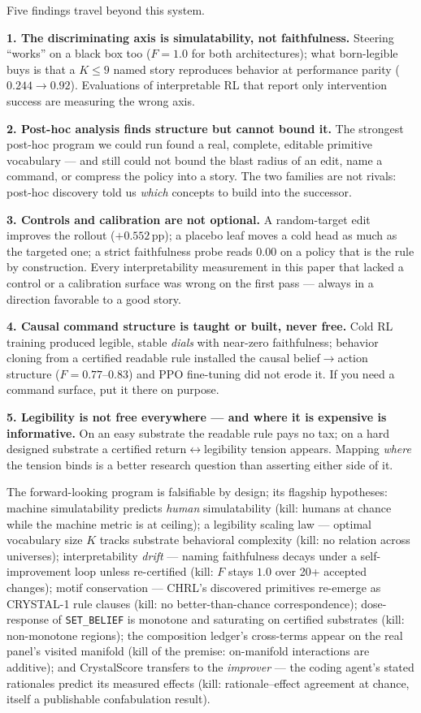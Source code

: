 \documentclass[11pt]{article}
\begin{document}
Five findings travel beyond this system.

\textbf{1. The discriminating axis is simulatability, not faithfulness.} Steering ``works'' on
a black box too ($F{=}1.0$ for both architectures); what born-legible buys is that a $K{\le}9$
named story reproduces behavior at performance parity ($0.244 \to 0.92$). Evaluations of
interpretable RL that report only intervention success are measuring the wrong axis.

\textbf{2. Post-hoc analysis finds structure but cannot bound it.} The strongest post-hoc
program we could run found a real, complete, editable primitive vocabulary --- and still could
not bound the blast radius of an edit, name a command, or compress the policy into a story.
The two families are not rivals: post-hoc discovery told us \emph{which} concepts to build into
the successor.

\textbf{3. Controls and calibration are not optional.} A random-target edit improves the
rollout ($+0.552$\,pp); a placebo leaf moves a cold head as much as the targeted one; a strict
faithfulness probe reads $0.00$ on a policy that is the rule by construction. Every
interpretability measurement in this paper that lacked a control or a calibration surface was
wrong on the first pass --- always in a direction favorable to a good story.

\textbf{4. Causal command structure is taught or built, never free.} Cold RL training produced
legible, stable \emph{dials} with near-zero faithfulness; behavior cloning from a certified
readable rule installed the causal belief$\to$action structure ($F = 0.77$--$0.83$) and PPO
fine-tuning did not erode it. If you need a command surface, put it there on purpose.

\textbf{5. Legibility is not free everywhere --- and where it is expensive is informative.} On
an easy substrate the readable rule pays no tax; on a hard designed substrate a certified
return$\leftrightarrow$legibility tension appears. Mapping \emph{where} the tension binds is a
better research question than asserting either side of it.

The forward-looking program is falsifiable by design; its flagship hypotheses: machine
simulatability predicts \emph{human} simulatability (kill: humans at chance while the machine
metric is at ceiling); a legibility scaling law --- optimal vocabulary size $K$ tracks substrate
behavioral complexity (kill: no relation across universes); interpretability \emph{drift} ---
naming faithfulness decays under a self-improvement loop unless re-certified (kill: $F$ stays
$1.0$ over 20+ accepted changes); motif conservation --- CHRL's discovered primitives re-emerge
as CRYSTAL-1 rule clauses (kill: no better-than-chance correspondence); dose-response of
\texttt{SET\_BELIEF} is monotone and saturating on certified substrates (kill: non-monotone
regions); the composition ledger's cross-terms appear on the real panel's visited manifold
(kill of the premise: on-manifold interactions are additive); and CrystalScore transfers to the
\emph{improver} --- the coding agent's stated rationales predict its measured effects (kill:
rationale--effect agreement at chance, itself a publishable confabulation result).
\end{document}
